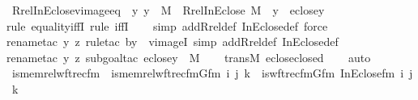 \begin{isabellebody}
\ Rrel{\isacharunderscore}{\kern0pt}InEclose{\isacharunderscore}{\kern0pt}vimage{\isacharunderscore}{\kern0pt}eq\ {\isacharcolon}{\kern0pt}\ {\isachardoublequoteopen}{\isasymAnd}y{\isachardot}{\kern0pt}\ y\ {\isasymin}\ M\ {\isasymLongrightarrow}\ Rrel{\isacharparenleft}{\kern0pt}InEclose{\isacharcomma}{\kern0pt}\ M{\isacharparenright}{\kern0pt}\ {\isacharminus}{\kern0pt}{\isacharbackquote}{\kern0pt}{\isacharbackquote}{\kern0pt}\ {\isacharbraceleft}{\kern0pt}y{\isacharbraceright}{\kern0pt}\ {\isacharequal}{\kern0pt}\ eclose{\isacharparenleft}{\kern0pt}y{\isacharparenright}{\kern0pt}{\isachardoublequoteclose}\isanewline
%
\isadelimproof
\ \ %
\endisadelimproof
%
\isatagproof
{}\isamarkupfalse%
{\isacharparenleft}{\kern0pt}rule\ equality{\isacharunderscore}{\kern0pt}iffI{\isacharcomma}{\kern0pt}\ rule\ iffI{\isacharparenright}{\kern0pt}\isanewline
\ \ \ \isamarkupfalse%
{\isacharparenleft}{\kern0pt}simp\ add{\isacharcolon}{\kern0pt}Rrel{\isacharunderscore}{\kern0pt}def\ InEclose{\isacharunderscore}{\kern0pt}def{\isacharcomma}{\kern0pt}\ force{\isacharparenright}{\kern0pt}\isanewline
\ \ \isamarkupfalse%
{\isacharparenleft}{\kern0pt}rename{\isacharunderscore}{\kern0pt}tac\ y\ z{\isacharcomma}{\kern0pt}\ rule{\isacharunderscore}{\kern0pt}tac\ b{\isacharequal}{\kern0pt}y\ \ vimageI{\isacharcomma}{\kern0pt}\ simp\ add{\isacharcolon}{\kern0pt}Rrel{\isacharunderscore}{\kern0pt}def\ InEclose{\isacharunderscore}{\kern0pt}def{\isacharparenright}{\kern0pt}\isanewline
\ \ \ \isamarkupfalse%
{\isacharparenleft}{\kern0pt}rename{\isacharunderscore}{\kern0pt}tac\ y\ z{\isacharcomma}{\kern0pt}\ subgoal{\isacharunderscore}{\kern0pt}tac\ {\isachardoublequoteopen}eclose{\isacharparenleft}{\kern0pt}y{\isacharparenright}{\kern0pt}\ {\isasymin}\ M{\isachardoublequoteclose}{\isacharparenright}{\kern0pt}\isanewline
\ \ \isamarkupfalse%
\ transM\ eclose{\isacharunderscore}{\kern0pt}closed\isanewline
\ \ \isamarkupfalse%
\ auto%
\endisatagproof
{\isafoldproof}%
%
\isadelimproof
\isanewline
%
\endisadelimproof
\isanewline
{}\isamarkupfalse%
\isanewline
\isanewline
{}\isamarkupfalse%
\ is{\isacharunderscore}{\kern0pt}memrel{\isacharunderscore}{\kern0pt}wftrec{\isacharunderscore}{\kern0pt}fm\ \ {\isachardoublequoteopen}is{\isacharunderscore}{\kern0pt}memrel{\isacharunderscore}{\kern0pt}wftrec{\isacharunderscore}{\kern0pt}fm{\isacharparenleft}{\kern0pt}Gfm{\isacharcomma}{\kern0pt}\ i{\isacharcomma}{\kern0pt}\ j{\isacharcomma}{\kern0pt}\ k{\isacharparenright}{\kern0pt}\ {\isasymequiv}\ is{\isacharunderscore}{\kern0pt}wftrec{\isacharunderscore}{\kern0pt}fm{\isacharparenleft}{\kern0pt}Gfm{\isacharcomma}{\kern0pt}\ InEclose{\isacharunderscore}{\kern0pt}fm{\isacharcomma}{\kern0pt}\ i{\isacharcomma}{\kern0pt}\ j{\isacharcomma}{\kern0pt}\ k{\isacharparenright}{\kern0pt}{\isachardoublequoteclose}\ \isanewline

\end{isabellebody}
